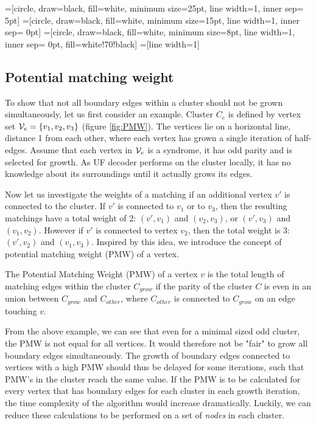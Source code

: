 =[circle, draw=black, fill=white, minimum size=25pt, line width=1, inner sep= 5pt]
=[circle, draw=black, fill=white, minimum size=15pt, line width=1, inner sep= 0pt]
=[circle, draw=black, fill=white, minimum size=8pt, line width=1, inner sep= 0pt, fill=white!70!black]
=[line width=1]
\tikzfading[name=fade right, left color=transparent!0, right color=transparent!100]


\subsection{Potential matching weight}\label{sec:PMW}

To show that not all boundary edges within a cluster should not be grown simultaneously, let us first consider an example. Cluster $C_e$ is defined by vertex set $\mathcal{V}_e = \{v_1, v_2, v_3\}$ (figure \ref{fig:PMW}). The vertices lie on a horizontal line, distance 1 from each other, where each vertex has grown a single iteration of half-edges. Assume that each vertex in $\mathcal{V}_e$ is a syndrome, it has odd parity and is selected for growth. As UF decoder performs on the cluster locally, it has no knowledge about its surroundings until it actually grows its edges.

Now let us investigate the weights of a matching if an additional vertex $v'$ is connected to the cluster.
If $v'$ is connected to $v_1$ or to $v_3$, then the resulting matchings have a total weight of 2: $(v',v_1)$ and $(v_2,v_3)$, or $(v',v_3)$ and $(v_1,v_2)$. However if $v'$ is connected to vertex $v_2$, then the total weight is 3: $(v', v_2)$ and $(v_1, v_3)$. Inspired by this idea, we introduce the concept of potential matching weight (PMW) of a vertex.

\begin{lemma}
  The Potential Matching Weight (PMW) of a vertex $v$ is the total length of matching edges within the cluster $C_{grow}$ if the parity of the cluster $C$ is even in an union between $C_{grow}$ and $C_{other}$, where $C_{other}$ is connected to $C_{grow}$ on an edge touching $v$.
\end{lemma}

From the above example, we can see that even for a minimal sized odd cluster, the PMW is not equal for all vertices. It would therefore not be "fair" to grow all boundary edges simultaneously. The growth of boundary edges connected to vertices with a high PMW should thus be delayed for some iterations, such that PMW's in the cluster reach the same value. If the PMW is to be calculated for every vertex that has boundary edges for each cluster in each growth iteration, the time complexity of the algorithm would increase dramatically. Luckily, we can reduce these calculations to be performed on a set of \emph{nodes} in each cluster.

